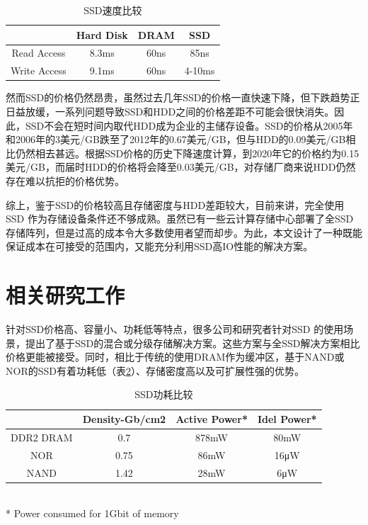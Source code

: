 \begin{table}[h]
\centering
\begin{tabular}{|c|c|c|c|}
\hline  & Hard Disk & DRAM & SSD \\ 
\hline Read Access & 8.3ms & 60ns & 85ns \\ 
\hline Write Access & 9.1ms & 60ns & 4-10ms \\ 
\hline 
\end{tabular} 
\caption{SSD速度比较}
\label{tab:ssd-speed-compare}
\end{table}

然而SSD的价格仍然昂贵，虽然过去几年SSD的价格一直快速下降，但下跌趋势正日益放缓，一系列问题导致SSD和HDD之间的价格差距不可能会很快消失。因此，SSD不会在短时间内取代HDD成为企业的主储存设备。SSD的价格从2005年和2006年的3美元/GB跌至了2012年的0.67美元/GB，但与HDD的0.09美元/GB相比仍然相去甚远。根据SSD价格的历史下降速度计算，到2020年它的价格约为0.15美元/GB，而届时HDD的价格将会降至0.03美元/GB，对存储厂商来说HDD仍然存在难以抗拒的价格优势。

综上，鉴于SSD的价格较高且存储密度与HDD差距较大，目前来讲，完全使用SSD 作为存储设备条件还不够成熟。虽然已有一些云计算存储中心部署了全SSD 存储阵列，但是过高的成本令大多数使用者望而却步。为此，本文设计了一种既能保证成本在可接受的范围内，又能充分利用SSD高IO性能的解决方案。

\section{相关研究工作}
\label{sec:related_works}

针对SSD价格高、容量小、功耗低等特点，很多公司和研究者针对SSD 的使用场景，提出了基于SSD的混合或分级存储解决方案。这些方案与全SSD解决方案相比价格更能被接受。同时，相比于传统的使用DRAM作为缓冲区，基于NAND或NOR的SSD有着功耗低（表\ref{tab:ssd-power-compare}）、存储密度高以及可扩展性强的优势。

\begin{table}[h]
\centering
\begin{tabular}{|c|c|c|c|}
\hline  & Density-Gb/cm2 & Active Power* & Idel Power* \\ 
\hline DDR2 DRAM & 0.7 & 878mW & 80mW \\ 
\hline NOR & 0.75 & 86mW & 16μW \\ 
\hline NAND & 1.42 & 28mW & 6μW \\ 
\hline 
\end{tabular}
\\ * Power consumed for 1Gbit of memory
\caption{SSD功耗比较}
\label{tab:ssd-power-compare}
\end{table}

